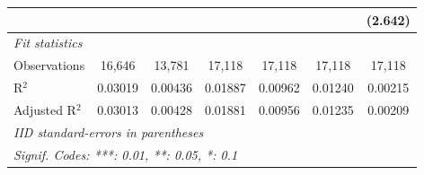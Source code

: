 \begin{tabular}{lcccccc}
                  &                 &                         &                 &                 &                 & (2.642)\\   
   \midrule
   \emph{Fit statistics}\\
   Observations   & 16,646          & 13,781                  & 17,118          & 17,118          & 17,118          & 17,118\\  
   R$^2$          & 0.03019         & 0.00436                 & 0.01887         & 0.00962         & 0.01240         & 0.00215\\  
   Adjusted R$^2$ & 0.03013         & 0.00428                 & 0.01881         & 0.00956         & 0.01235         & 0.00209\\  
   \midrule \midrule
   \multicolumn{7}{l}{\emph{IID standard-errors in parentheses}}\\
   \multicolumn{7}{l}{\emph{Signif. Codes: ***: 0.01, **: 0.05, *: 0.1}}\\
\end{tabular}
\par\endgroup


